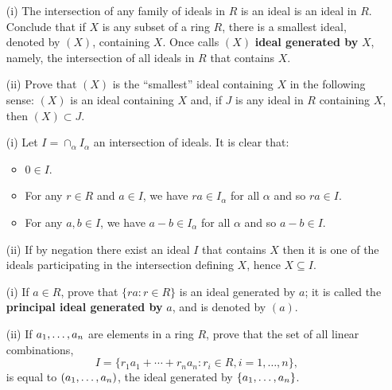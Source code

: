 \begin{myenumerate}
\begin{itemize}
\end{itemize}

\item
\begin{excopy}
\begin{itemize}
 \item[(i)]
   The intersection of any family of ideals in $R$ is an ideal is an ideal
   in $R$. Conclude that if $X$ is any subset of a ring $R$, there is a smallest
   ideal, denoted by \((X)\), containing $X$. Once calls \((X)\)
   \textbf{ideal generated by} $X$, namely, the intersection of all ideals
   in $R$ that contains $X$.
 \item[(ii)]
   Prove that \((X)\) is the ``smallest'' ideal containing $X$ in
   the following sense: \((X)\) is an ideal containing $X$ and,
   if $J$ is any ideal in $R$ containing $X$, then \((X)\subset J\).
\end{itemize}
\end{excopy}

\begin{itemize}
 \item[(i)]
   Let \(I = \cap_\alpha I_\alpha\) an intersection of ideals.
   It is clear that:
   \begin{itemize}
    \item \(0\in I\).
    \item
      For any \(r\in R\) and \(a\in I\),
      we have \(ra \in I_\alpha\) for all \(\alpha\)
      and so \(ra\in I\).
    \item
      For any \(a,b\in I\), we have \(a-b\in I_\alpha\) for all \(\alpha\)
      and so \(a-b\in I\).
   \end{itemize}
 \item[(ii)]
   If by negation there exist an ideal $I$ that contains $X$
   then it is one of the ideals participating in the intersection defining
   $X$, hence \(X\subseteq I\).
\end{itemize}

\item
\begin{excopy}
\begin{itemize}
 \item[(i)]
   If \(a\in R\), prove that \(\{ra:r\in R\}\) is an ideal generated by $a$;
   it is called the
   \textbf{principal ideal generated by } $a$, and is denoted by \((a)\).
 \item[(ii)]
   If \(a_1,\ldots,a_{n}\) are elements in a ring $R$, prove that the set of
   all linear combinations,
   \[I = \{r_1a_1 + \cdots + r_na_n: r_i\in R, i=1,\ldots,n\},\]
   is equal to \((a_1,\ldots,a_{n})\), the ideal generated by
   \(\{a_1,\ldots,a_{n}\}\).
\end{itemize}
\end{excopy}


\end{myenumerate}
